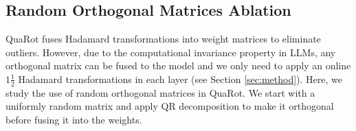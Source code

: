 \begin{table}[H]
    \centering

    \caption{
     Weight-only quantization results on \wiki on \llama models. We use asymmetric per-column quantization and keep the inputs and KV cache in FP16. We show the perplexity results >100 by Inf. We show the failed GPTQ experiments using NaN.}
    \vspace{1em}
    \vspace{5pt}
    \label{tab:ppl_weight_only}
\end{table}



\subsection{Random Orthogonal Matrices Ablation}\label{sec:appx_random_orth_matrices}
QuaRot fuses Hadamard transformations into weight matrices to eliminate outliers. However, due to the computational  invariance property in LLMs, any 
orthogonal matrix can be fused to the model and we only need to apply an online $1\tfrac{1}{2}$ Hadamard transformations in each layer (see Section \ref{sec:method}). 
Here, we study the use of random orthogonal matrices in QuaRot. We start with a uniformly random matrix and apply QR decomposition to make it orthogonal before fusing it into the weights. 


